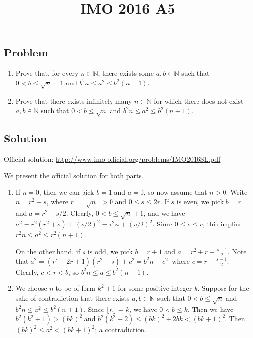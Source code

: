 \documentclass{article}
\title{IMO 2016 A5}
\author{}
\date{}
\newcommand{\N}{\mathbb{N}}
\begin{document}
\maketitle



\subsection*{Problem}

\begin{enumerate}
\item Prove that, for every $n \in \N$, there exists some $a, b \in \N$ such that $0 < b \leq \sqrt{n} + 1$ and $b^2 n \leq a^2 \leq b^2 (n + 1)$.
\item Prove that there exists infinitely many $n \in \N$ for which there does not exist $a, b \in \N$ such that $0 < b \leq \sqrt{n}$ and $b^2 n \leq a^2 \leq b^2 (n + 1)$.
\end{enumerate}



\subsection*{Solution}

Official solution: \url{http://www.imo-official.org/problems/IMO2016SL.pdf}

We present the official solution for both parts.

\begin{enumerate}

\item
If $n = 0$, then we can pick $b = 1$ and $a = 0$, so now assume that $n > 0$.
Write $n = r^2 + s$, where $r = \lfloor \sqrt{n} \rfloor > 0$ and $0 \leq s \leq 2r$.
If $s$ is even, we pick $b = r$ and $a = r^2 + s/2$.
Clearly, $0 < b \leq \sqrt{n} + 1$, and we have $a^2 = r^2 (r^2 + s) + (s/2)^2 = r^2 n + (s/2)^2$.
Since $0 \leq s \leq r$, this implies $r^2 n \leq a^2 \leq r^2 (n + 1)$.

On the other hand, if $s$ is odd, we pick $b = r + 1$ and $a = r^2 + r + \frac{s + 1}{2}$.
Note that $a^2 = (r^2 + 2r + 1) (r^2 + s) + c^2 = b^2 n + c^2$, where $c = r - \frac{s - 1}{2}$.
Clearly, $c < r < b$, so $b^2 n \leq a \leq b^2 (n + 1)$.


\item
We choose $n$ to be of form $k^2 + 1$ for some positive integer $k$.
Suppose for the sake of contradiction that there exists $a, b \in \N$ such that $0 < b \leq \sqrt{n}$ and $b^2 n \leq a^2 \leq b^2 (n + 1)$.
Since $\lfloor n \rfloor = k$, we have $0 < b \leq k$.
Then we have $b^2 (k^2 + 1) > (bk)^2$ and $b^2 (k^2 + 2) \leq (bk)^2 + 2bk < (bk + 1)^2$.
Then $(bk)^2 \leq a^2 < (bk + 1)^2$; a contradiction.

\end{enumerate}
\end{document}
